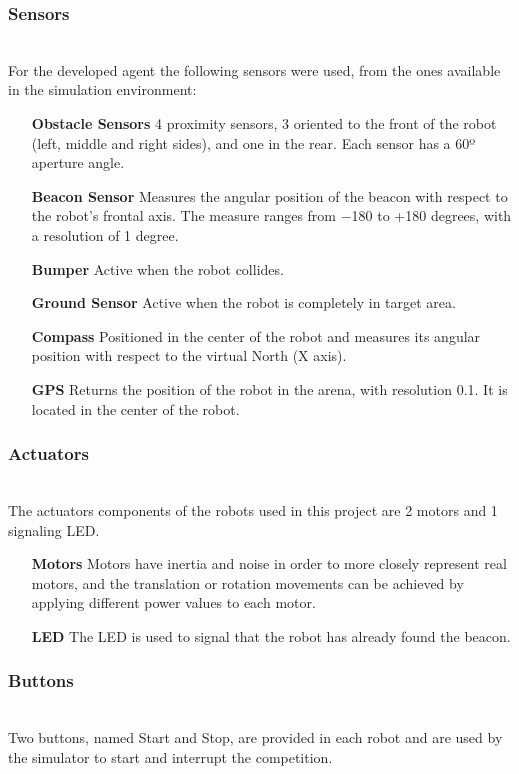 \documentclass[oribibl]{llncs}
\begin{document}
\subsubsection{Sensors}\hfill \\
For the developed agent the following sensors were used, from the ones available in the simulation environment: 
\begin{itemize}
  \item[\textbf{Obstacle Sensors}]
  4 proximity sensors, 3 oriented to the front of the robot (left, middle and right sides), and one in the rear. Each sensor has a 60º aperture angle.
  \item[\textbf{Beacon Sensor}]
  Measures the angular position of the beacon with respect to the robot's frontal axis. The measure ranges from −180 to +180 degrees, with a resolution of 1 degree.
  \item[\textbf{Bumper}]Active when the robot collides.
  \item[\textbf{Ground Sensor}]
  Active when the robot is completely in target area.
  \item[\textbf{Compass}]
  Positioned in the center of the robot and measures its angular position with respect to
the virtual North (X axis).
  \item[\textbf{GPS}]
  Returns the position of the robot in the arena, with resolution 0.1. It is located in the center of the robot.
\end{itemize}

\subsubsection{Actuators}\hfill \\
The actuators components of the robots used in this project are 2 motors and 1 signaling LED. 
\begin{itemize}
  \item[\textbf{Motors}]
Motors have inertia and noise in order to more closely represent real motors, and the translation or rotation movements can be achieved by applying different power values to each motor.
  \item[\textbf{LED}]
The LED is used to signal that the robot has already found the beacon.
\end{itemize}

\subsubsection{Buttons}\hfill \\
Two buttons, named Start and Stop, are provided in each robot and are used by the simulator to start and interrupt the competition.
\end{document}
